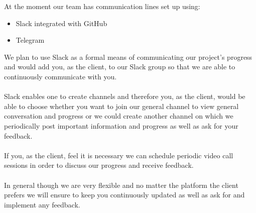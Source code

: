 At the moment our team has communication lines set up using:
		\begin{itemize}
			\item Slack integrated with GitHub
			\item Telegram
		\end{itemize}
		We plan to use Slack as a formal means of communicating our project's progress and would add you, as the client, to our Slack group so that we are able to continuously communicate with you.\\\\
		Slack enables one to create channels and therefore you, as the client, would be able to choose whether you want to join our general channel to view general conversation and progress or we could create another channel on which we periodically post important information and progress as well as ask for your feedback.\\\\
		If you, as the client, feel it is necessary we can schedule periodic video call sessions in order to discuss our progress and receive feedback.\\\\
		In general though we are very flexible and no matter the platform the client prefers we will ensure to keep you continuously updated as well as ask for and implement any feedback.